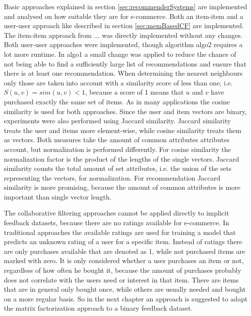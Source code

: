 \documentclass[10pt]{reportMaster}
\begin{document}
Basic approaches explained in section \ref{sec:recommenderSystems} are implemented and analysed on how suitable they are for e-commerce.
Both an item-item and a user-user approach like described in section \ref{sec:memBasedCF} are implemented.
The item-item approach from ... was directly implemented without any changes. %
Both user-user approaches were implemented, though algorithm algo2 requires a lot more runtime. %
In algo1 a small change was applied to reduce the chance of not being able to find a sufficiently large list of recommendations and ensure that there is at least one recommendation.
When determining the nearest neighbours only those are taken into account with a similarity score of less than one, i.e. $S(u,v) = sim(u, v) < 1$, because a score of 1 means that $u$ and $v$ have purchased exactly the same set of items.
As in many applications the cosine similarity is used for both approaches.
Since the user and item vectors are binary, experiments were also performed using Jaccard similarity.
Jaccard similarity treats the user and items more element-wise, while cosine similarity treats them as vectors.
Both measures take the amount of common attributes attributes account, but normalization is performed differently.
For cosine similarity the normalization factor is the product of the lengths of the single vectors.
Jaccard similarity counts the total amount of set attributes, i.e. the union of the sets representing the vectors, for normalization.
For recommendation Jaccard similarity is more promising, because the amount of common attributes is more important than single vector length.

The collaborative filtering approaches cannot be applied directly to implicit feedback datasets, because there are no ratings available for e-commerce.
In traditional approaches the available ratings are used for training a model that predicts an unknown rating of a user for a specific item.
Instead of ratings there are only purchases available that are denoted as 1, while not purchased items are marked with zero.
It is only considered whether a user purchases an item or not, regardless of how often he bought it, because the amount of purchases probably does not correlate with the users need or interest in that item.
There are items that are in general only bought once, while others are usually needed and bought on a more regular basis. 
So in the next chapter an approach is suggested to adapt the matrix factorization approach to a binary feedback dataset.
\end{document}
